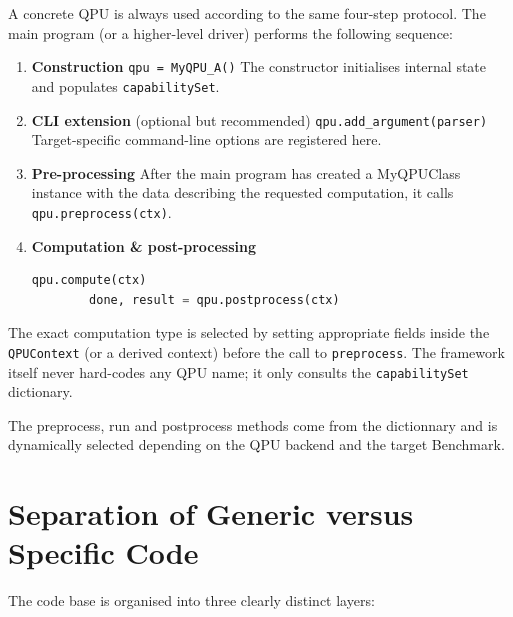 A concrete QPU is always used according to the same four-step protocol.  The main program (or a higher-level driver) performs the following sequence:

\begin{enumerate}
  \item \textbf{Construction}  
        \texttt{qpu = MyQPU\_A()}  
        The constructor initialises internal state and populates \texttt{capabilitySet}.

  \item \textbf{CLI extension} (optional but recommended)  
        \texttt{qpu.add\_argument(parser)}  
        Target-specific command-line options are registered here.

  \item \textbf{Pre-processing}  
        After the main program has created a MyQPUClass instance with the data describing the requested computation, it calls  
        \texttt{qpu.preprocess(ctx)}.

  \item \textbf{Computation \& post-processing}  
        \begin{lstlisting}[language=Python]
        qpu.compute(ctx)
        done, result = qpu.postprocess(ctx)
        \end{lstlisting}
\end{enumerate}

The exact computation type is selected by setting appropriate fields inside the \texttt{QPUContext} (or a derived context) before the call to \texttt{preprocess}.  The framework itself never hard-codes any QPU name; it only consults the \texttt{capabilitySet} dictionary.

The preprocess, run and postprocess methods come from the dictionnary and is dynamically selected depending on the QPU backend and the target Benchmark.


\section{Separation of Generic versus Specific Code}

The code base is organised into three clearly distinct layers:

